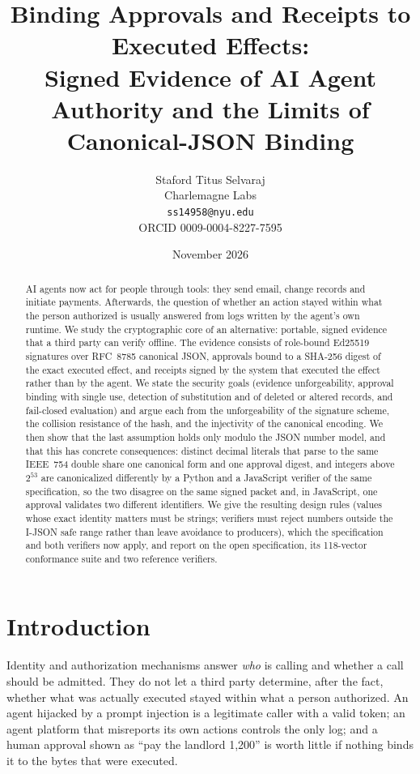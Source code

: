 \documentclass[11pt,a4paper]{article}
\title{Binding Approvals and Receipts to Executed Effects:\\ Signed Evidence of AI Agent Authority and the Limits of Canonical-JSON Binding}
\author{Staford Titus Selvaraj\\ Charlemagne Labs\\ \texttt{ss14958@nyu.edu}\\ ORCID 0009-0004-8227-7595}
\date{November 2026}
\theoremstyle{definition}
\theoremstyle{remark}
\begin{document}
\maketitle

\begin{abstract}
AI agents now act for people through tools: they send email, change records and initiate payments. Afterwards, the question of whether an action stayed within what the person authorized is usually answered from logs written by the agent's own runtime. We study the cryptographic core of an alternative: portable, signed evidence that a third party can verify offline. The evidence consists of role-bound Ed25519 signatures over RFC~8785 canonical JSON, approvals bound to a SHA-256 digest of the exact executed effect, and receipts signed by the system that executed the effect rather than by the agent. We state the security goals (evidence unforgeability, approval binding with single use, detection of substitution and of deleted or altered records, and fail-closed evaluation) and argue each from the unforgeability of the signature scheme, the collision resistance of the hash, and the injectivity of the canonical encoding. We then show that the last assumption holds only modulo the JSON number model, and that this has concrete consequences: distinct decimal literals that parse to the same IEEE~754 double share one canonical form and one approval digest, and integers above $2^{53}$ are canonicalized differently by a Python and a JavaScript verifier of the same specification, so the two disagree on the same signed packet and, in JavaScript, one approval validates two different identifiers. We give the resulting design rules (values whose exact identity matters must be strings; verifiers must reject numbers outside the I-JSON safe range rather than leave avoidance to producers), which the specification and both verifiers now apply, and report on the open specification, its 118-vector conformance suite and two reference verifiers.
\end{abstract}

\section{Introduction}

Identity and authorization mechanisms answer \emph{who} is calling and whether a call should be admitted. They do not let a third party determine, after the fact, whether what was actually executed stayed within what a person authorized. An agent hijacked by a prompt injection is a legitimate caller with a valid token; an agent platform that misreports its own actions controls the only log; and a human approval shown as ``pay the landlord 1{,}200'' is worth little if nothing binds it to the bytes that were executed.
\end{document}
